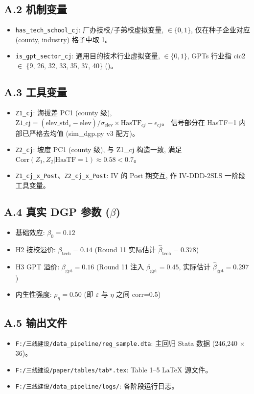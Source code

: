 \documentclass[11pt,a4paper]{article}
\begin{document}
\subsection*{A.2 机制变量}

\begin{itemize}
\item \texttt{has\_tech\_school\_cj}: 厂办技校/子弟校虚拟变量, $\in\{0,1\}$,
      仅在种子企业对应 (county, industry) 格子中取 1。
\item \texttt{is\_gpt\_sector\_cj}: 通用目的技术行业虚拟变量, $\in\{0,1\}$,
      GPTs 行业指 cic2 $\in$ \{9, 26, 32, 33, 35, 37, 40\} (\citet{bresnahan1995})。
\end{itemize}

\subsection*{A.3 工具变量}

\begin{itemize}
\item \texttt{Z1\_cj}: 海拔差 PC1 (county 级), 
      $\mathrm{Z1\_cj} = (\mathrm{elev\_std}_c - \bar{\mathrm{elev}}) /
      \sigma_{\mathrm{elev}} \times \mathrm{HasTF}_{cj} + \epsilon_{cj}$。
      信号部分在 HasTF=1 内部已严格去均值 (sim\_dgp.py v3 配方)。
\item \texttt{Z2\_cj}: 坡度 PC1 (county 级), 与 Z1\_cj 构造一致,
      满足 $\mathrm{Corr}(Z_1,Z_2|\mathrm{HasTF=1})\approx 0.58<0.7$。
\item \texttt{Z1\_cj\_x\_Post}、\texttt{Z2\_cj\_x\_Post}: IV 的 Post 期交互,
      作 IV-DDD-2SLS 一阶段工具变量。
\end{itemize}

\subsection*{A.4 真实 DGP 参数 ($\beta$)}

\begin{itemize}
\item 基础效应: $\beta_0 = 0.12$
\item H2 技校溢价: $\beta_{\mathrm{tech}} = 0.14$  (Round 11 实际估计 $\hat{\beta}_{\mathrm{tech}}=0.378$)
\item H3 GPT 溢价: $\beta_{\mathrm{gpt}} = 0.16$  (Round 11 注入 $\beta_{\mathrm{gpt}}=0.45$, 实际估计 $\hat{\beta}_{\mathrm{gpt}}=0.297$)
\item 内生性强度: $\rho_{\eta} = 0.50$ (即 $\varepsilon$ 与 $\eta$ 之间 corr=0.5)
\end{itemize}

\subsection*{A.5 输出文件}

\begin{itemize}
\item \texttt{F:/三线建设/data\_pipeline/reg\_sample.dta}: 主回归 Stata 数据
      (246,240 $\times$ 36)。
\item \texttt{F:/三线建设/paper/tables/tab*.tex}: Table 1--5 LaTeX 源文件。
\item \texttt{F:/三线建设/data\_pipeline/logs/}: 各阶段运行日志。
\end{itemize}
\end{document}
